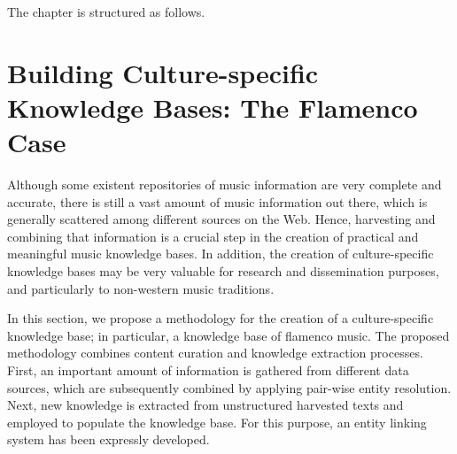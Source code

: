 The chapter is structured as follows. 


\section{Building Culture-specific Knowledge Bases: The Flamenco Case}


Although some existent repositories of music information are very complete and accurate, there is still a vast amount of music information out there, which is generally scattered among different sources on the Web. Hence, harvesting and combining that information is a crucial step in the creation of practical and meaningful music knowledge bases. In addition, the creation of culture-specific knowledge bases may be very valuable for research and dissemination purposes, and particularly to non-western music traditions. 

In this section, we propose a methodology for the creation of a culture-specific knowledge base; in particular, a knowledge base of flamenco music. The proposed methodology combines content curation and knowledge extraction processes. First, an important amount of information is gathered from different data sources, which are subsequently combined by applying pair-wise entity resolution. Next, new knowledge is extracted from unstructured harvested texts and employed to populate the knowledge base. For this purpose, an entity linking system has been expressly developed. %



